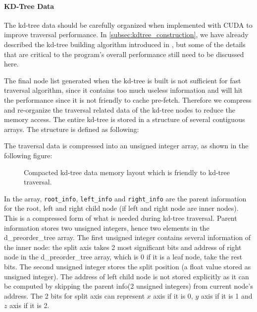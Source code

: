 \paragraph{KD-Tree Data}

The kd-tree data should be carefully organized when implemented with CUDA to improve traversal performance. In \ref{subsec:kdtree_construction}, we have already described the kd-tree building algorithm introduced in \cite{Zhou2008}, but some of the details that are critical to the program's overall performance still need to be discussed here.

The final node list generated when the kd-tree is built is not sufficient for fast traversal algorithm, since it contains too much useless information and will hit the performance since it is not friendly to cache pre-fetch. 
Therefore we compress and re-organize the traversal related data of the kd-tree nodes to reduce the memory access. The entire kd-tree is stored in a structure of several contiguous arrays. The structure is defined as following:



The traversal data is compressed into an unsigned integer array, as shown in the following figure:

\begin{figure}[htp]
    \centering
    \renewcommand{\thefigure}{\thechapter.\arabic{figure}}
    \caption[Compacted memory layout of constructed kd-tree data]{Compacted kd-tree data memory layout which is friendly to kd-tree traversal.}
    \label{fig:kdtree_data_memory_layout}
\end{figure}

In the array, {\tt root\_info}, {\tt left\_info} and {\tt right\_info} are the parent information for the root, left and right child node (if left and right node are inner nodes). This is a compressed form of what is needed during kd-tree traversal. Parent information stores two unsigned integers, hence two elements in the d\_preorder\_tree array. The first unsigned integer contains several information of the inner node: the split axis takes 2 most significant bits and address of right node in the d\_preorder\_tree array, which is 0 if it is a leaf node, take the rest bits. The second unsigned integer stores the split position (a float value stored as unsigned integer). The address of left child node is not stored explicitly as it can be computed by skipping the parent info(2 unsigned integers) from current node's address. The 2 bits for split axis can represent \(x\) axis if it is 0, \(y\) axis if it is 1 and \(z\) axis if it is 2.

